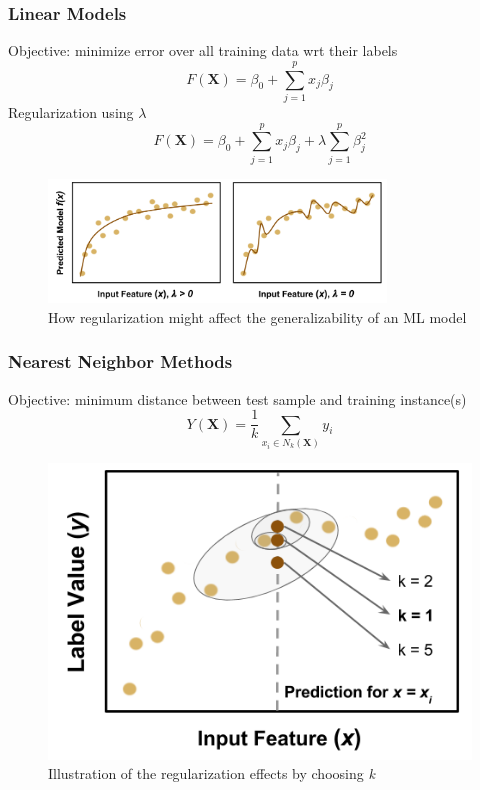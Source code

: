 \begin{frame}
  \frametitle{Linear Models}
  \begin{multicols}{2}
    Objective: minimize error over all training data wrt their labels
    $$ F(\boldsymbol{X}) = \beta_{0} +  \sum_{j=1}^{p} x_{j} \beta_{j} $$  
    Regularization using $\lambda$
    $$ F(\boldsymbol{X}) = \beta_{0} +  \sum_{j=1}^{p} x_{j} \beta_{j} + \lambda \sum_{j=1}^{p} \beta_{j}^2 $$
  \end{multicols}
  \begin{figure}[h!]
    \centering
    \includegraphics[width=0.8\textwidth]{./figures/regularization.png}
    \caption{How regularization might affect the generalizability of an ML model}
  \end{figure}
\end{frame}

\begin{frame}
  \frametitle{Nearest Neighbor Methods}
  \begin{minipage}{0.4\textwidth}
    Objective: minimum distance between test sample and training instance(s)
    $$ Y(\boldsymbol{X}) = \frac{1}{k} \sum_{x_i \in N_k(\boldsymbol{X})} y_i $$
  \end{minipage}%
  \begin{minipage}{0.6\textwidth}
    \begin{figure}[h!]
      \centering
      \includegraphics[height=0.5\textheight]{./figures/nn-fig.png}
      \caption{Illustration of the regularization effects by choosing \textit{k}}
    \end{figure}
  \end{minipage}
\end{frame}

